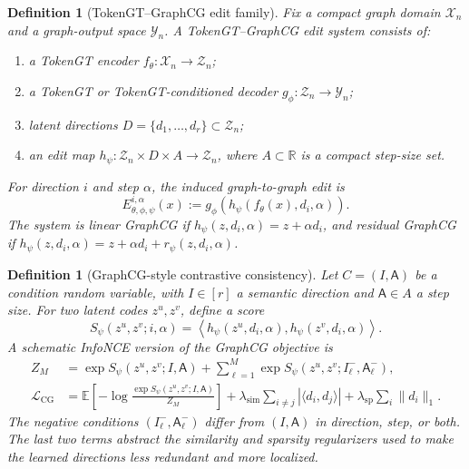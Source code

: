 \documentclass[11pt]{article}
\newtheorem{definition}[theorem]{Definition}
\newcommand{\R}{\mathbb{R}}
\newcommand{\cX}{\mathcal{X}}
\newcommand{\cZ}{\mathcal{Z}}
\newcommand{\cY}{\mathcal{Y}}
\begin{document}
\begin{definition}[TokenGT--GraphCG edit family]
\label{def:tokengt-graphcg}
Fix a compact graph domain $\cX_n$ and a graph-output space $\cY_n$.  A TokenGT--GraphCG edit system consists of:
\begin{enumerate}
  \item a TokenGT encoder $f_\theta:\cX_n\to\cZ_n$;
  \item a TokenGT or TokenGT-conditioned decoder $g_\phi:\cZ_n\to\cY_n$;
  \item latent directions $D=\{d_1,\dots,d_r\}\subset\cZ_n$;
  \item an edit map $h_\psi:\cZ_n\times D\times A\to\cZ_n$, where $A\subset\R$ is a compact step-size set.
\end{enumerate}
For direction $i$ and step $\alpha$, the induced graph-to-graph edit is
\[
  E_{\theta,\phi,\psi}^{i,\alpha}(x)
  :=g_\phi\!\left(h_\psi(f_\theta(x),d_i,\alpha)\right).
\]
The system is \emph{linear GraphCG} if $h_\psi(z,d_i,\alpha)=z+\alpha d_i$, and \emph{residual GraphCG} if $h_\psi(z,d_i,\alpha)=z+\alpha d_i+r_\psi(z,d_i,\alpha)$.
\end{definition}

\begin{definition}[GraphCG-style contrastive consistency]
\label{def:graphcg-loss}
Let $C=(I,\mathsf A)$ be a condition random variable, with $I\in[r]$ a semantic direction and $\mathsf A\in A$ a step size.  For two latent codes $z^u,z^v$, define a score
\[
  S_\psi(z^u,z^v; i,\alpha)
  =
  \left\langle h_\psi(z^u,d_i,\alpha),
  h_\psi(z^v,d_i,\alpha)\right\rangle .
\]
A schematic InfoNCE version of the GraphCG objective is
\[
\begin{aligned}
  Z_M
  &=
  \exp S_\psi(z^u,z^v;I,\mathsf A)
  +
  \sum_{\ell=1}^M
  \exp S_\psi(z^u,z^v;I_\ell^-,\mathsf A_\ell^-),\\
  \mathcal L_{\mathrm{CG}}
  &=
  \mathbb E\!\left[
  -\log
  \frac{\exp S_\psi(z^u,z^v;I,\mathsf A)}{Z_M}
  \right]
  +\lambda_{\mathrm{sim}}\sum_{i\ne j}|\langle d_i,d_j\rangle|
  +\lambda_{\mathrm{sp}}\sum_i\|d_i\|_1 .
\end{aligned}
\]
The negative conditions $(I_\ell^-,\mathsf A_\ell^-)$ differ from $(I,\mathsf A)$ in direction, step, or both.  The last two terms abstract the similarity and sparsity regularizers used to make the learned directions less redundant and more localized.
\end{definition}
\end{document}
